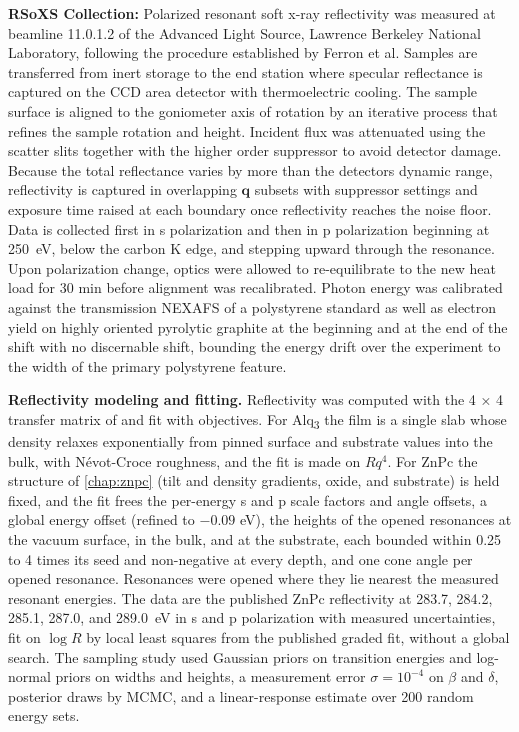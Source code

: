 \textbf{RSoXS Collection:} Polarized resonant soft x-ray reflectivity was measured at beamline 11.0.1.2 of the Advanced Light Source, Lawrence Berkeley National Laboratory, following the procedure established by Ferron et al.\autocite{ferronCompositionDictatesMolecular2023} Samples are transferred from inert storage to the end station where specular reflectance is captured on the CCD area detector with thermoelectric cooling. The sample surface is aligned to the goniometer axis of rotation by an iterative process that refines the sample rotation and height. Incident flux was attenuated using the scatter slits together with the higher order suppressor to avoid detector damage. Because the total reflectance varies by more than the detectors dynamic range, reflectivity is captured in overlapping \(\mathbf{q}\) subsets with suppressor settings and exposure time raised at each boundary once reflectivity reaches the noise floor. Data is collected first in s polarization and then in p polarization beginning at \qty{250}{eV}, below the carbon K edge, and stepping upward through the resonance. Upon polarization change, optics were allowed to re-equilibrate to the new heat load for 30 min before alignment was recalibrated. Photon energy was calibrated against the transmission NEXAFS of a polystyrene standard as well as electron yield on highly oriented pyrolytic graphite at the beginning and at the end of the shift with no discernable shift, bounding the energy drift over the experiment to the width of the primary polystyrene feature.

\textbf{Reflectivity modeling and fitting.} Reflectivity was computed with the 4 × 4 transfer matrix of  and fit with  objectives.\autocite{ALSRSOXSRefloxide2026a,nelsonRefnxNeutronXray2019} For Alq\textsubscript{3} the film is a single slab whose density relaxes exponentially from pinned surface and substrate values into the bulk, with Névot-Croce roughness, and the fit is made on \(Rq^{4}\). For ZnPc the structure of \cref{chap:znpc} (tilt and density gradients, oxide, and substrate) is held fixed, and the fit frees the per-energy s and p scale factors and angle offsets, a global energy offset (refined to \(- 0.09\) eV), the heights of the opened resonances at the vacuum surface, in the bulk, and at the substrate, each bounded within 0.25 to 4 times its seed and non-negative at every depth, and one cone angle per opened resonance. Resonances were opened where they lie nearest the measured resonant energies. The data are the published ZnPc reflectivity at 283.7, 284.2, 285.1, 287.0, and \qty{289.0}{eV} in s and p polarization with measured uncertainties, fit on \(\log R\) by local least squares from the published graded fit, without a global search. The sampling study used Gaussian priors on transition energies and log-normal priors on widths and heights, a measurement error \(\sigma = 10^{- 4}\) on \(\beta\) and \(\delta\), posterior draws by MCMC, and a linear-response estimate over 200 random energy sets.
